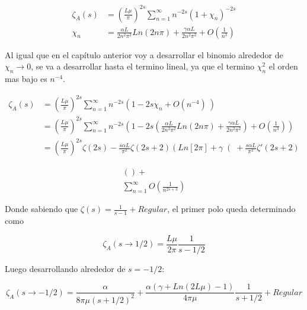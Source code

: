 \begin{equation}
\begin{aligned}
    \zeta _A (s) &= \left( \frac{L \mu }{\pi} \right)  ^{2 s} 
    \sum _{n=1} ^{\infty} n ^{- 2  s} 
    \left(
    	1 + \chi _n 
    	\right) ^{-2 s} \\[5pt]
		 \chi _n &= 
    	\frac{\alpha L  }{2 n^2 \pi ^2} Ln(2 n \pi) + 
    	\frac{\gamma \alpha L}{2 n^2 \pi ^2 } +
    	O \left(
    		\frac{1}{n^3} \right) 
\end{aligned}
\end{equation}

Al igual que en el capítulo anterior voy a desarrollar el binomio alrededor de  $\chi _n \rightarrow 0$, se va a desarrollar hasta el termino lineal, ya que el termino $\chi _n ^2 $ el orden mas bajo es $n ^{-4} $. 


\begin{align}
    \zeta _A (s) &= \left( \frac{L \mu}{\pi} \right) ^{2 s}
    \sum _{n=1} ^{\infty} 
    n ^{-2s}
    \left(
    1 - 2 s \chi _n + O(n ^{-4}) \
    \right)   \\[5pt]
     &= \left( \frac{L \mu }{\pi} \right) ^{2 s}
    \sum _{n=1} ^{\infty} n ^{-2 s} 
    \left(
    1 - 2s \left(
    \frac{\alpha L }{2 n ^2 \pi ^2} Ln( 2  n \pi) + 
    \frac{\gamma \alpha L }{2 n ^2 \pi ^2} 
	\right) +
    O \left( \frac{1}{n ^{3} }  \right)
    \right) \nonumber \\
    &=  \left( \frac{L \mu }{ \pi } \right) ^{2 s}  
    \zeta (2 s) -
	\frac{ s \alpha L}{ \pi ^2} \zeta (2s+2)
	\left(
	   Ln[2  \pi ] + \gamma
	\right( + 
    \frac{s \alpha L}{\pi ^2}
	\zeta '(2s+2)
\end{align}    
  
\begin{align}
   
    \left(
    
	\right) + \\
    \sum _{n=1} ^{\infty} O \left( \frac{1}{n ^{2s+3}} \right)
\end{align}

Donde sabiendo que $\zeta(s) = \frac{1}{s-1} + Regular$, el primer polo queda determinado como

\begin{equation}
    \zeta _A (s \rightarrow 1/2) = \frac{L \mu }{2 \pi} \frac{1}{s-1/2}    
\end{equation}

Luego desarrollando alrededor de $s=-1/2$:

\begin{equation}
    \zeta _A (s \rightarrow -1/2 ) =  \frac{\alpha}{8  \pi \mu (s+1/2)^2} +
     \frac{ \alpha ( \gamma  + Ln(2L \mu ) -1 ) }{4  \pi \mu } \frac{1}{s+1/2} + 
    Regular
\end{equation}

